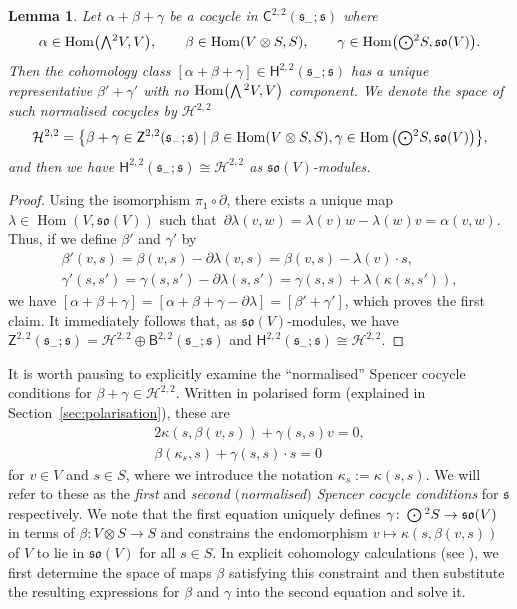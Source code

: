 \documentclass[11pt]{article}
\numberwithin{equation}{section}
\numberwithin{equation}{section}
\newtheorem{Lemma}[Theorem]{Lemma}
\newcommand{\fs}{\mathfrak{s}}
\newcommand{\fso}{\mathfrak{so}}
\newcommand{\cH}{\mathcal{H}}
\newcommand{\ssB}{\mathsf{B}}
\newcommand{\ssC}{\mathsf{C}}
\newcommand{\ssH}{\mathsf{H}}
\newcommand{\ssZ}{\mathsf{Z}}
\newcommand{\Wedge}{\mathchoice{{\textstyle\bigwedge}}{\bigwedge}{\bigwedge}{\bigwedge}}	%
\newcommand{\Odot}{\mathchoice{{\textstyle\bigodot}}{\bigodot}{\bigodot}{\bigodot}}
\newcommand{\1}{\mathbbm{1}}
\DeclareMathOperator{\Hom}{Hom}
\begin{document}
\begin{Lemma} \label{lemma:H22-full-flat-model}
	Let $\alpha+\beta+\gamma$ be a cocycle in $\ssC^{2,2}(\fs_-;\fs)$ where
	\begin{align}\label{eq:22-cocycle-comps}
		\alpha\in\Hom\bigl(\Wedge^2V,V\bigr),
		\qquad\beta\in\Hom(V\otimes S,S),
		\qquad\gamma\in\Hom\bigl(\Odot^2S,\fso(V)\bigr).
	\end{align}
	Then the cohomology class $[\alpha+\beta+\gamma]\in \ssH^{2,2}(\fs_-;\fs)$ has a unique representative $\beta'+\gamma'$ with no $\Hom\bigl(\Wedge^2 V,V\bigr)$ component. We denote the space of such \emph{normalised cocycles} by $\cH^{2,2}$
	\[
		\cH^{2,2}
		= \qty{\beta+\gamma \in \ssZ^{2,2}(\fs_-;\fs)
			 \mid
				\beta\in\Hom(V\otimes S,S), \gamma\in\Hom\big(\Odot^2S,\fso(V)\big)
			},
	\]
	and then we have
$\ssH^{2,2}(\fs_-;\fs) \cong \cH^{2,2}
$
	as $\fso(V)$-modules.
\end{Lemma}

\begin{proof}
	Using the isomorphism $\pi_1\circ\partial$, there exists a unique map $\lambda\in\Hom(V,\fso(V))$ such that~${\partial\lambda(v,w)=\lambda(v)w - \lambda(w)v = \alpha(v,w)}$.
	Thus, if we define $\beta'$ and $\gamma'$ by
	\begin{gather*}%
		\beta'(v,s) = \beta(v,s) - \partial\lambda(v,s)
			= \beta(v,s) - \lambda(v)\cdot s,\\
		\gamma'(s,s') = \gamma(s,s') - \partial\lambda(s,s')
			= \gamma(s,s) + \lambda(\kappa(s,s')),
	\end{gather*}
	we have
$[\alpha+\beta+\gamma]
		= [\alpha+\beta+\gamma-\partial\lambda]
		= [\beta' + \gamma']$,
	which proves the first claim. It immediately follows that, as $\fso(V)$-modules, we have $\ssZ^{2,2}(\fs_-;\fs)=\cH^{2,2}\oplus\ssB^{2,2}(\fs_-;\fs)$ and $\ssH^{2,2}(\fs_-;\fs) \cong \cH^{2,2}$.
\end{proof}

It is worth pausing to explicitly examine the ``normalised'' Spencer cocycle conditions for $\beta+\gamma\in\cH^{2,2}$. Written in polarised form (explained in Section~\ref{sec:polarisation}), these are
\begin{gather}
	2\kappa(s,\beta(v,s)) + \gamma(s,s)v = 0, \label{eq:cocycle-1}	\\
	\beta(\kappa_s,s) + \gamma(s,s)\cdot s = 0	\label{eq:cocycle-2}
\end{gather}
for $v\in V$ and $s\in S$, where we introduce the notation $\kappa_s:=\kappa(s,s)$. We will refer to these as the \emph{first} and \emph{second} \emph{$($normalised$)$ Spencer cocycle conditions} for $\fs$ respectively. We note that the first equation uniquely defines $\gamma\colon\Odot^2S\to\fso(V)$ in terms of $\beta\colon V\otimes S\to S$ and constrains the endomorphism $v\mapsto \kappa(s,\beta(v,s))$ of $V$ to lie in $\fso(V)$ for all $s\in S$. In explicit cohomology calculations (see \cite{Beckett2021,deMedeiros2016,deMedeiros2018,Figueroa-OFarrill2017}), we first determine the space of maps $\beta$ satisfying this constraint and then substitute the resulting expressions for $\beta$ and $\gamma$ into the second equation and solve it.
\end{document}
